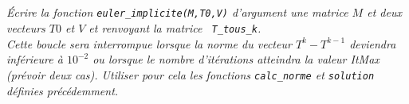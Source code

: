 \subparagraph{}
\textit{Écrire la fonction \texttt{euler\_implicite(M,T0,V)} d'argument une matrice $M$ et 
deux vecteurs $T0$ et $V$ et renvoyant la matrice \texttt{ T\_tous\_k}.\\
Cette boucle sera interrompue lorsque la norme  du vecteur $T^k-T^{k-1}$ deviendra inférieure à $10^{-2}$ ou lorsque le 
nombre d'itérations atteindra la valeur ItMax (prévoir deux cas). Utiliser pour cela les fonctions \texttt{calc\_norme} 
et \texttt{solution} définies précédemment.}
\fi

\ifprof


